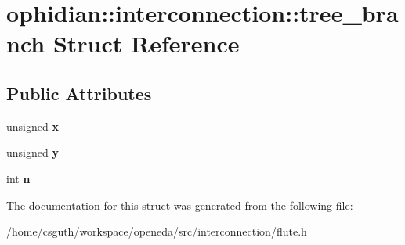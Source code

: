 \hypertarget{structophidian_1_1interconnection_1_1tree__branch}{\section{ophidian\-:\-:interconnection\-:\-:tree\-\_\-branch Struct Reference}
\label{structophidian_1_1interconnection_1_1tree__branch}
}
\subsection*{Public Attributes}
\begin{DoxyCompactItemize}
\item 
\hypertarget{structophidian_1_1interconnection_1_1tree__branch_aac80dc47681f83c1a9aeacd5e2ab46a1}{unsigned {\bfseries x}}\label{structophidian_1_1interconnection_1_1tree__branch_aac80dc47681f83c1a9aeacd5e2ab46a1}

\item 
\hypertarget{structophidian_1_1interconnection_1_1tree__branch_a8aeab81888cd0631494c680865a90c82}{unsigned {\bfseries y}}\label{structophidian_1_1interconnection_1_1tree__branch_a8aeab81888cd0631494c680865a90c82}

\item 
\hypertarget{structophidian_1_1interconnection_1_1tree__branch_a9f80eef468ec3a62f1d21af20e8d5b99}{int {\bfseries n}}\label{structophidian_1_1interconnection_1_1tree__branch_a9f80eef468ec3a62f1d21af20e8d5b99}

\end{DoxyCompactItemize}


The documentation for this struct was generated from the following file\-:\begin{DoxyCompactItemize}
\item 
/home/csguth/workspace/openeda/src/interconnection/flute.\-h\end{DoxyCompactItemize}
